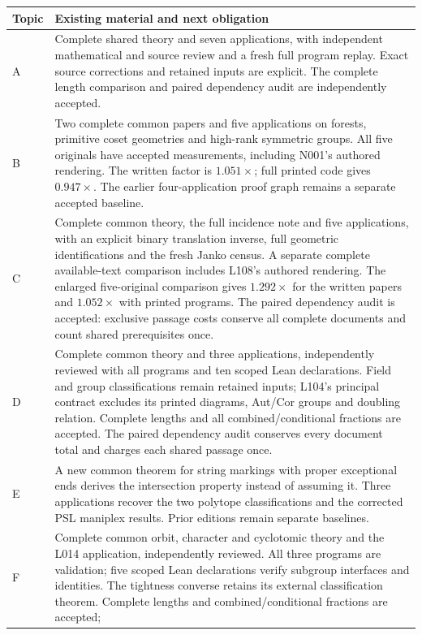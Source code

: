 \documentclass[11pt,a4paper]{article}
\begin{document}
\begin{longtable}{p{}p{}}
\toprule Topic & Existing material and next obligation\\\midrule
A & Complete shared theory and seven applications, with independent
mathematical and source review and a fresh full program replay. Exact
source corrections and retained inputs are explicit. The complete length
comparison and paired dependency audit are independently accepted.\\
B & Two complete common papers and five applications on forests, primitive
coset geometries and high-rank symmetric groups. All five originals have
accepted measurements, including N001's authored rendering. The written
factor is $1.051\times$; full printed code gives $0.947\times$. The earlier
four-application proof graph remains a separate accepted baseline.\\
C & Complete common theory, the full incidence note and five applications, with an explicit binary
translation inverse, full geometric identifications and the fresh Janko
census. A separate complete available-text comparison includes L108's
authored rendering. The enlarged five-original comparison gives
$1.292\times$ for the written papers and $1.052\times$ with printed programs.
The paired dependency audit is accepted: exclusive passage costs conserve
all complete documents and count shared prerequisites once.\\
D & Complete common theory and three applications, independently reviewed
with all programs and ten scoped Lean declarations. Field and group
classifications remain retained inputs; L104's principal contract excludes
its printed diagrams, Aut/Cor groups and doubling relation. Complete lengths
and all combined/conditional fractions are accepted. The paired dependency
audit conserves every document total and charges each shared passage once.\\
E & A new common theorem for string markings with proper exceptional
ends derives the intersection property instead of assuming it. Three
applications recover the two polytope classifications and the corrected
PSL maniplex results. Prior editions remain separate baselines.\\
F & Complete common orbit, character and cyclotomic theory and the L014
application, independently reviewed. All three programs are validation;
five scoped Lean declarations verify subgroup interfaces and identities.
The tightness converse retains its external classification theorem.
Complete lengths and combined/conditional fractions are accepted;

\end{longtable}
\end{document}
